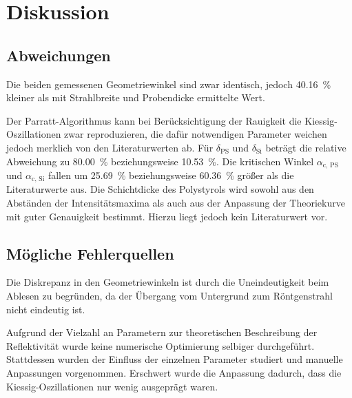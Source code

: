 \section{Diskussion}
\label{sec:diskussion}

\subsection{Abweichungen}
Die beiden gemessenen Geometriewinkel sind zwar identisch,
jedoch \SI{40.16}{\percent} kleiner als mit Strahlbreite und Probendicke ermittelte Wert.

Der Parratt-Algorithmus kann bei Berücksichtigung der Rauigkeit
die Kiessig-Oszillationen zwar reproduzieren,
die dafür notwendigen Parameter weichen jedoch merklich von den Literaturwerten ab.
Für $\delta_\text{PS}$ und $\delta_\text{Si}$ beträgt die relative Abweichung zu \cite{versuchsanleitung}
\SI{80.00}{\percent} beziehungsweise \SI{10.53}{\percent}.
Die kritischen Winkel $\alpha_\text{c, PS}$ und $\alpha_\text{c, Si}$
fallen um \SI{25.69}{\percent} beziehungsweise \SI{60.36}{\percent} größer als die Literaturwerte \cite{versuchsanleitung} aus.
Die Schichtdicke des Polystyrols wird
    sowohl aus den Abständen der Intensitätsmaxima
    als auch aus der Anpassung der Theoriekurve
mit guter Genauigkeit bestimmt.
Hierzu liegt jedoch kein Literaturwert vor.


\subsection{Mögliche Fehlerquellen}
Die Diskrepanz in den Geometriewinkeln ist durch die Uneindeutigkeit beim Ablesen zu begründen,
da der Übergang vom Untergrund zum Röntgenstrahl nicht eindeutig ist.

Aufgrund der Vielzahl an Parametern zur theoretischen Beschreibung der Reflektivität
wurde keine numerische Optimierung selbiger durchgeführt.
Stattdessen wurden der Einfluss der einzelnen Parameter studiert
und manuelle Anpassungen vorgenommen.
Erschwert wurde die Anpassung dadurch,
dass die Kiessig-Oszillationen nur wenig ausgeprägt waren.
